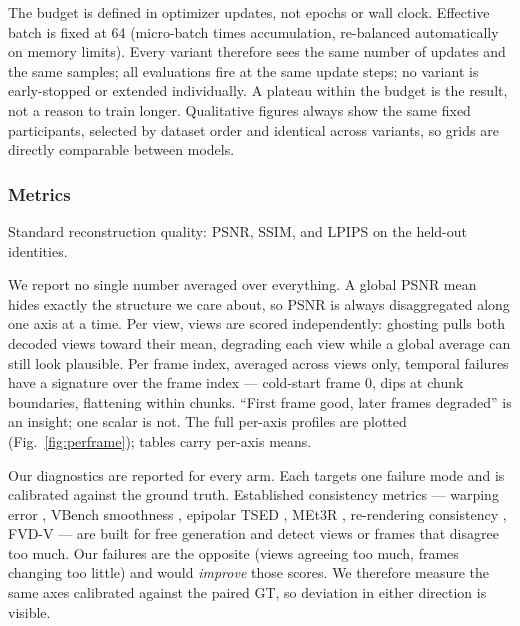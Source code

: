 The budget is defined in optimizer updates, not epochs or wall clock. Effective batch is fixed at 64 (micro-batch times accumulation, re-balanced automatically on memory limits). Every variant therefore sees the same number of updates and the same samples; all evaluations fire at the same update steps; no variant is early-stopped or extended individually. A plateau within the budget is the result, not a reason to train longer. Qualitative figures always show the same fixed participants, selected by dataset order and identical across variants, so grids are directly comparable between models.

\subsubsection{Metrics}


Standard reconstruction quality: PSNR, SSIM, and LPIPS \cite{zhang2018unreasonable} on the held-out identities.

We report no single number averaged over everything. A global PSNR mean hides exactly the structure we care about, so PSNR is always disaggregated along one axis at a time. Per view, views are scored independently: ghosting pulls both decoded views toward their mean, degrading each view while a global average can still look plausible. Per frame index, averaged across views only, temporal failures have a signature over the frame index --- cold-start frame 0, dips at chunk boundaries, flattening within chunks. ``First frame good, later frames degraded'' is an insight; one scalar is not. The full per-axis profiles are plotted (Fig.~\ref{fig:perframe}); tables carry per-axis means.

Our diagnostics are reported for every arm. Each targets one failure mode and is calibrated against the ground truth. Established consistency metrics --- warping error \cite{lai2018learning}, VBench smoothness \cite{huang2024vbench}, epipolar TSED \cite{yu2023long}, MEt3R \cite{asim2025met3r}, re-rendering consistency \cite{gao2024cat3d}, FVD-V \cite{xie2024sv4d} --- are built for free generation and detect views or frames that disagree too much. Our failures are the opposite (views agreeing too much, frames changing too little) and would \emph{improve} those scores. We therefore measure the same axes calibrated against the paired GT, so deviation in either direction is visible.

